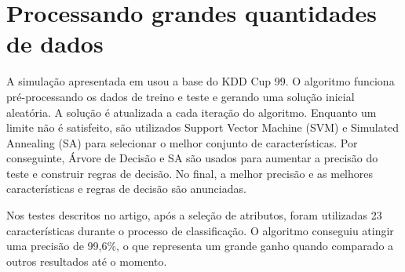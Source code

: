 \section{Processando grandes quantidades de dados}
A simulação apresentada em \cite{lin12} usou a base do KDD Cup 99. O algoritmo funciona pré-processando os dados de treino e teste e gerando uma solução
inicial aleatória. A solução é atualizada a cada iteração do algoritmo. Enquanto um limite não é satisfeito,
são utilizados Support Vector Machine (SVM) e Simulated Annealing (SA) para selecionar o melhor conjunto de
características. Por conseguinte, Árvore de Decisão e SA são usados para aumentar a precisão do teste e construir
regras de decisão. No final, a melhor precisão e as melhores características e regras de decisão são anunciadas.
\par Nos testes descritos no  artigo, após a seleção de atributos, foram utilizadas 23 características durante o processo de
classificação. O algoritmo conseguiu atingir uma precisão de 99,6\%, o que representa um grande ganho quando comparado
 a outros resultados até o momento.


